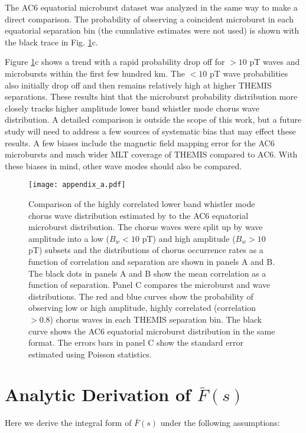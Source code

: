 \documentclass[draft]{agujournal2019}
\begin{document}
The AC6 equatorial microburst dataset was analyzed in the same way to make a direct comparison. The probability of observing a coincident microburst in each equatorial separation bin (the cumulative estimates were not used) is shown with the black trace in Fig. \ref{fig_appendixa_1}c.

Figure \ref{fig_appendixa_1}c shows a trend with a rapid probability drop off for $> 10$ pT waves and microbursts within the first few hundred km. The $< 10$ pT wave probabilities also initially drop off and then remains relatively high at higher THEMIS separations. These results hint that the microburst probability distribution more closely tracks higher amplitude lower band whistler mode chorus wave distribution. A detailed comparison is outside the scope of this work, but a future study will need to address a few sources of systematic bias that may effect these results. A few biases include the magnetic field mapping error for the AC6 microbursts and much wider MLT coverage of THEMIS compared to AC6. With these biases in mind, other wave modes should also be compared.

\begin{figure}
\texttt{[image: appendix\_a.pdf]}
\caption{Comparison of the highly correlated lower band whistler mode chorus wave distribution estimated by  to the AC6 equatorial microburst distribution. The chorus waves were split up by wave amplitude into a low ($B_w < 10$ pT) and high amplitude ($B_w > 10$ pT) subsets and the distributions of chorus occurrence rates as a function of correlation and separation are shown in panels A and B. The black dots in panels A and B show the mean correlation as a function of separation. Panel C compares the microburst and wave distributions. The red and blue curves show the probability of observing low or high amplitude, highly correlated (correlation $> 0.8$) chorus waves in each THEMIS separation bin. The black curve shows the AC6 equatorial microburst distribution in the same format. The errors bars in panel C show the standard error estimated using Poisson statistics.}
\label{fig_appendixa_1}
\end{figure}

\section{Analytic Derivation of $\bar{F}(s)$} \label{appendixb}
Here we derive the integral form of $\bar{F}(s)$ under the following assumptions:
\end{document}

